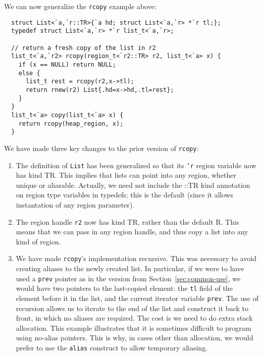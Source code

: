 We can now generalize the \texttt{rcopy} example above:
\begin{verbatim}
  struct List<`a,`r::TR>{`a hd; struct List<`a,`r> *`r tl;};
  typedef struct List<`a,`r> *`r list_t<`a,`r>;

  // return a fresh copy of the list in r2
  list_t<`a,`r2> rcopy(region_t<`r2::TR> r2, list_t<`a> x) {
    if (x == NULL) return NULL;
    else {
      list_t rest = rcopy(r2,x->tl);
      return rnew(r2) List{.hd=x->hd,.tl=rest};
    }
  }
  list_t<`a> copy(list_t<`a> x) {
    return rcopy(heap_region, x);
  }
\end{verbatim}
We have made three key changes to the prior version of \texttt{rcopy}:
\begin{enumerate}
\item The definition of \texttt{List} has been generalized so that its
  \texttt{`r} region variable now has kind TR.  This implies that lists can
  point into any region, whether unique or aliasable.  Actually, we need not
  include the ::TR kind annotation on region type variables in typedefs;
  this is the default (since it allows instantation of any region
  parameter).
\item The region handle \texttt{r2} now has kind TR, rather than the default
  R.  This means that we can pass in any region handle, and thus copy a list
  into any kind of region.
\item We have made \texttt{rcopy}'s implementation recursive.  This was
  necessary to avoid creating aliases to the newly created list.  In
  particular, if we were to have used a \texttt{prev} pointer as in the
  version from Section~\ref{sec:common-use}, we would have two pointers to
  the last-copied element: the \texttt{tl} field of the element before it in
  the list, and the current iterator variable \texttt{prev}.  The use of
  recursion allows us to iterate to the end of the list and construct it
  back to front, in which no aliases are required.  The cost is we need to
  do extra stack allocation.  This example illustrates that it is sometimes
  difficult to program using no-alias pointers.  This is why, in cases other
  than allocation, we would prefer to use the \texttt{alias} construct to
  allow temporary aliasing.
\end{enumerate}

